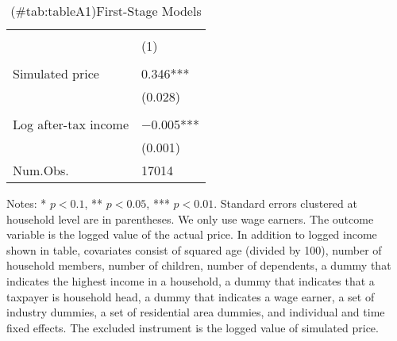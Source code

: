 \begin{table}

\caption{(\#tab:tableA1)First-Stage Models\label{tab:main-stage1}}
\centering
\fontsize{8}{10}\selectfont
\begin{threeparttable}
\begin{tabular}[t]{l>{\centering\arraybackslash}p{18.75em}}
\toprule
\multicolumn{1}{c}{ } & \multicolumn{1}{c}{Actual price} \\
\cmidrule(l{3pt}r{3pt}){2-2}
  & (1)\\
\midrule
\addlinespace[0.3em]
\multicolumn{2}{l}{\textit{Excluded instruments}}\\
\hspace{1em}Simulated price & \num{0.346}***\\
\hspace{1em} & (\num{0.028})\\
\addlinespace[0.3em]
\multicolumn{2}{l}{\textit{Covariates}}\\
\hspace{1em}Log after-tax income & \num{-0.005}***\\
\hspace{1em} & (\num{0.001})\\
\midrule
Num.Obs. & \num{17014}\\
\bottomrule
\end{tabular}
\begin{tablenotes}
\item Notes: * $p < 0.1$, ** $p < 0.05$, *** $p < 0.01$. Standard errors clustered at household level are in parentheses. We only use wage earners. The outcome variable is the logged value of the actual price. In addition to logged income shown in table, covariates consist of squared age (divided by 100), number of household members, number of children, number of dependents, a dummy that indicates the highest income in a household, a dummy that indicates that a taxpayer is household head, a dummy that indicates a wage earner, a set of industry dummies, a set of residential area dummies, and individual and time fixed effects. The excluded instrument is the logged value of simulated price.
\end{tablenotes}
\end{threeparttable}
\end{table}

